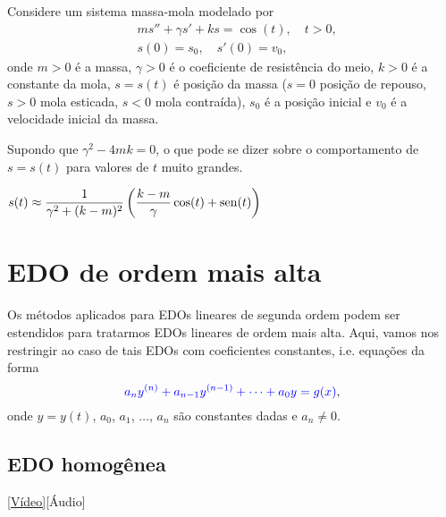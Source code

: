 \begin{exer}
  Considere um sistema massa-mola modelado por
  \begin{align}
    & ms'' + \gamma s' + ks = \cos(t),\quad t>0,\\
    & s(0) = s_0,\quad s'(0) = v_0,
  \end{align}
  onde $m>0$ é a massa, $\gamma>0$ é o coeficiente de resistência do meio, $k>0$ é a constante da mola, $s=s(t)$ é posição da massa ($s=0$ posição de repouso, $s>0$ mola esticada, $s<0$ mola contraída), $s_0$ é a posição inicial e $v_0$ é a velocidade inicial da massa.

  Supondo que $\gamma^2-4mk = 0$, o que pode se dizer sobre o comportamento de $s=s(t)$ para valores de $t$ muito grandes. 
\end{exer}
\begin{resp}
  $s(t) \approx \displaystyle \frac{1}{\gamma^2 + (k-m)^2}\left(\frac{k-m}{\gamma}\cos(t) + \operatorname{sen}(t)\right)$
\end{resp}

\section{EDO de ordem mais alta}\label{cap_edolin_sec_edon}

Os métodos aplicados para EDOs lineares de segunda ordem podem ser estendidos para tratarmos EDOs lineares de ordem mais alta. Aqui, vamos nos restringir ao caso de tais EDOs com coeficientes constantes, i.e. equações da forma
\begin{equation}
  {\color{blue}a_ny^{(n)} + a_{n-1}y^{(n-1)} + \cdots + a_0y = g(x)},
\end{equation}
onde $y = y(t)$, $a_0$, $a_1$, $\dotsc$, $a_{n}$ são constantes dadas e $a_n\neq 0$.

\subsection{EDO homogênea}

\begin{flushright}
  \href{https://archive.org/details/edo-ordem-mais-alta-homogenea}{[Vídeo]}[Áudio]
\end{flushright}

